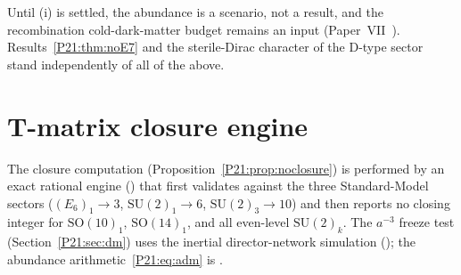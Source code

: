 \documentclass[11pt,a4paper]{article}
\theoremstyle{definition}\newtheorem{definition}[theorem]{Definition}
\theoremstyle{remark}
\newcommand{\SU}{\mathrm{SU}}
\newcommand{\SO}{\mathrm{SO}}
\begin{document}
Until (i) is settled, the abundance is a scenario, not a result, and the
recombination cold-dark-matter budget remains an input
(Paper~VII~\cite{Paper7}). Results~\ref{P21:thm:noE7} and the sterile-Dirac
character of the D-type sector stand independently of all of the above.

\appendix
\section{T-matrix closure engine}
\label{P21:app:engine}
The closure computation (Proposition~\ref{P21:prop:noclosure}) is performed
by an exact rational engine
() that first validates
against the three Standard-Model sectors
($(E_6)_1\to3$, $\SU(2)_1\to6$, $\SU(2)_3\to10$) and then reports no
closing integer for $\SO(10)_1$, $\SO(14)_1$, and all even-level
$\SU(2)_k$. The $a^{-3}$ freeze test (Section~\ref{P21:sec:dm}) uses the
inertial director-network simulation
(); the
abundance arithmetic~\eqref{P21:eq:adm} is
.
\end{document}
